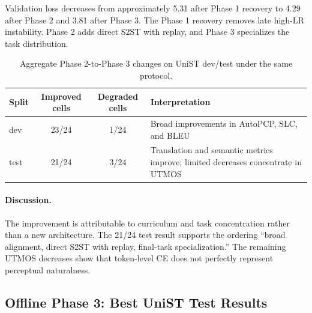 \documentclass[11pt,a4paper]{article}
\begin{document}
Validation loss decreases from approximately 5.31 after Phase 1 recovery to 4.29 after Phase 2 and 3.81 after Phase 3. The Phase 1 recovery removes late high-LR instability. Phase 2 adds direct S2ST with replay, and Phase 3 specializes the task distribution.

\begin{table}[H]
\centering
\caption{Aggregate Phase 2-to-Phase 3 changes on UniST dev/test under the same protocol.}
\label{tab:p2p3_summary}
\begin{tabularx}{\textwidth}{lCCY}
\toprule
Split & Improved cells & Degraded cells & Interpretation \\
\midrule
dev & 23/24 & 1/24 & Broad improvements in AutoPCP, SLC, and BLEU \\
test & 21/24 & 3/24 & Translation and semantic metrics improve; limited decreases concentrate in UTMOS \\
\bottomrule
\end{tabularx}
\end{table}

\paragraph{Discussion.}
The improvement is attributable to curriculum and task concentration rather than a new architecture. The 21/24 test result supports the ordering ``broad alignment, direct S2ST with replay, final-task specialization.'' The remaining UTMOS decreases show that token-level CE does not perfectly represent perceptual naturalness.

\subsection{Offline Phase 3: Best UniST Test Results}

\begin{table}[H]
\centering
\caption{Best Offline Phase 3 checkpoint `iter\_0009075` on UniST test.}
\label{tab:p3_test}
\end{table}
\end{document}
